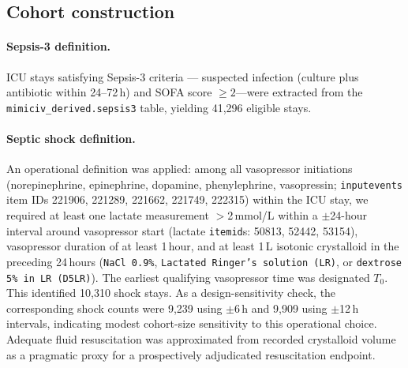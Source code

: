 \documentclass[referee,lineno,pdflatex]{sn-article-template/sn-jnl}
\begin{document}
\subsection{Cohort construction}
\label{sec:cohort}

\paragraph{Sepsis-3 definition.}
ICU stays satisfying Sepsis-3 criteria \cite{singer2016}---
suspected infection (culture plus antibiotic within 24--72\,h)
and SOFA score $\geq 2$---were extracted from the
\texttt{mimiciv\_derived.sepsis3} table, yielding 41,296 eligible stays.

\paragraph{Septic shock definition.}
An operational definition was applied:
among all vasopressor initiations (norepinephrine, epinephrine, dopamine,
phenylephrine, vasopressin; \texttt{inputevents} item IDs 221906, 221289, 221662,
221749, 222315) within the ICU stay,
we required at least one lactate measurement $>$2\,mmol/L
within a $\pm$24-hour interval around vasopressor start
(lactate \texttt{itemid}s: 50813, 52442, 53154),
vasopressor duration of at least 1\,hour,
and at least 1\,L isotonic crystalloid in the preceding 24\,hours
(\texttt{NaCl 0.9\%}, \texttt{Lactated Ringer's solution (LR)}, or \texttt{dextrose 5\% in LR (D5LR)}).
The earliest qualifying vasopressor time was designated $T_0$.
This identified 10,310 shock stays.
As a design-sensitivity check, the corresponding shock counts were 9,239 using
$\pm$6\,h and 9,909 using $\pm$12\,h intervals, indicating modest cohort-size
sensitivity to this operational choice.
Adequate fluid resuscitation was approximated from recorded crystalloid volume as a
pragmatic proxy for a prospectively adjudicated resuscitation endpoint.
\end{document}
